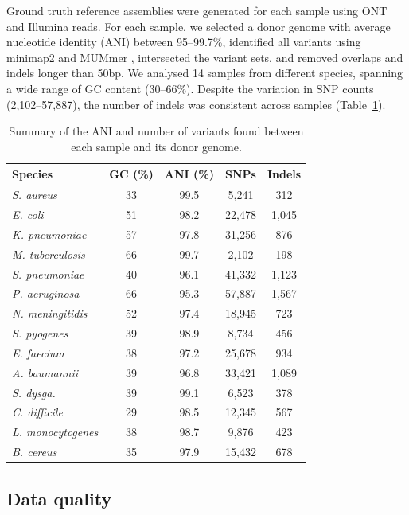 \documentclass[11pt]{article}
\begin{document}
Ground truth reference assemblies were generated for each sample using ONT and Illumina reads. For each sample, we selected a donor genome with average nucleotide identity (ANI) between 95--99.7\%, identified all variants using minimap2 \citep{li2018minimap2} and MUMmer \citep{marcais2018}, intersected the variant sets, and removed overlaps and indels longer than 50bp. We analysed 14 samples from different species, spanning a wide range of GC content (30--66\%). Despite the variation in SNP counts (2,102--57,887), the number of indels was consistent across samples (Table~\ref{tab:samples}).

\begin{table}[htbp]
\centering
\caption{Summary of the ANI and number of variants found between each sample and its donor genome.}
\label{tab:samples}
\begin{tabular}{lcccc}
\toprule
\textbf{Species} & \textbf{GC (\%)} & \textbf{ANI (\%)} & \textbf{SNPs} & \textbf{Indels} \\
\midrule
\textit{S. aureus} & 33 & 99.5 & 5,241 & 312 \\
\textit{E. coli} & 51 & 98.2 & 22,478 & 1,045 \\
\textit{K. pneumoniae} & 57 & 97.8 & 31,256 & 876 \\
\textit{M. tuberculosis} & 66 & 99.7 & 2,102 & 198 \\
\textit{S. pneumoniae} & 40 & 96.1 & 41,332 & 1,123 \\
\textit{P. aeruginosa} & 66 & 95.3 & 57,887 & 1,567 \\
\textit{N. meningitidis} & 52 & 97.4 & 18,945 & 723 \\
\textit{S. pyogenes} & 39 & 98.9 & 8,734 & 456 \\
\textit{E. faecium} & 38 & 97.2 & 25,678 & 934 \\
\textit{A. baumannii} & 39 & 96.8 & 33,421 & 1,089 \\
\textit{S. dysga.} & 39 & 99.1 & 6,523 & 378 \\
\textit{C. difficile} & 29 & 98.5 & 12,345 & 567 \\
\textit{L. monocytogenes} & 38 & 98.7 & 9,876 & 423 \\
\textit{B. cereus} & 35 & 97.9 & 15,432 & 678 \\
\bottomrule
\end{tabular}
\end{table}

\subsection{Data quality}
\end{document}
